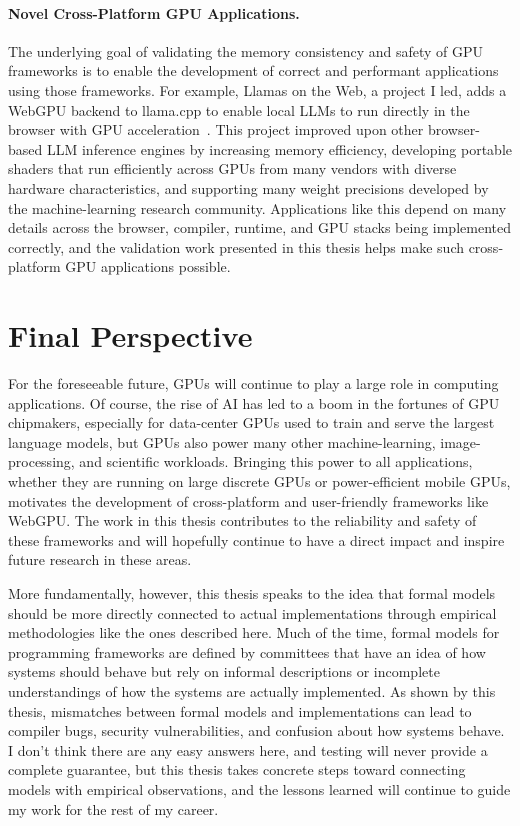 \paragraph{Novel Cross-Platform GPU Applications.} The underlying goal of validating the memory consistency and safety of GPU frameworks is to enable the development of correct and performant applications using those frameworks. For example, Llamas on the Web, a project I led, adds a WebGPU backend to llama.cpp to enable local LLMs to run directly in the browser with GPU acceleration~\cite{levine2026llamaweb}. This project improved upon other browser-based LLM inference engines by increasing memory efficiency, developing portable shaders that run efficiently across GPUs from many vendors with diverse hardware characteristics, and supporting many weight precisions developed by the machine-learning research community. Applications like this depend on many details across the browser, compiler, runtime, and GPU stacks being implemented correctly, and the validation work presented in this thesis helps make such cross-platform GPU applications possible.

\section{Final Perspective}

For the foreseeable future, GPUs will continue to play a large role in computing applications. Of course, the rise of AI has led to a boom in the fortunes of GPU chipmakers, especially for data-center GPUs used to train and serve the largest language models, but GPUs also power many other machine-learning, image-processing, and scientific workloads. Bringing this power to all applications, whether they are running on large discrete GPUs or power-efficient mobile GPUs, motivates the development of cross-platform and user-friendly frameworks like WebGPU. The work in this thesis contributes to the reliability and safety of these frameworks and will hopefully continue to have a direct impact and inspire future research in these areas.

More fundamentally, however, this thesis speaks to the idea that formal models should be more directly connected to actual implementations through empirical methodologies like the ones described here. Much of the time, formal models for programming frameworks are defined by committees that have an idea of how systems should behave but rely on informal descriptions or incomplete understandings of how the systems are actually implemented. As shown by this thesis, mismatches between formal models and implementations can lead to compiler bugs, security vulnerabilities, and confusion about how systems behave. I don't think there are any easy answers here, and testing will never provide a complete guarantee, but this thesis takes concrete steps toward connecting models with empirical observations, and the lessons learned will continue to guide my work for the rest of my career.

